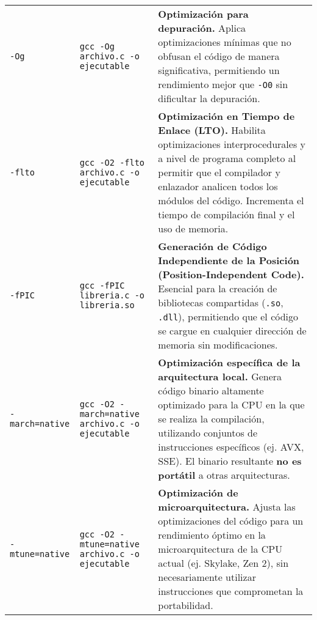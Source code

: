 \documentclass{article}
\begin{document}
\begin{longtable}{l p{4.5cm} p{8cm}}
		\addlinespace
		\texttt{-Og} & \texttt{gcc -Og archivo.c -o ejecutable} & \textbf{Optimización para depuración.} Aplica optimizaciones mínimas que no obfusan el código de manera significativa, permitiendo un rendimiento mejor que \texttt{-O0} sin dificultar la depuración. \\
		\addlinespace
		\texttt{-flto} & \texttt{gcc -O2 -flto archivo.c -o ejecutable} & \textbf{Optimización en Tiempo de Enlace (LTO).} Habilita optimizaciones interprocedurales y a nivel de programa completo al permitir que el compilador y enlazador analicen todos los módulos del código. Incrementa el tiempo de compilación final y el uso de memoria. \\
		\addlinespace
		\texttt{-fPIC} & \texttt{gcc -fPIC libreria.c -o libreria.so} & \textbf{Generación de Código Independiente de la Posición (Position-Independent Code).} Esencial para la creación de bibliotecas compartidas (\texttt{.so}, \texttt{.dll}), permitiendo que el código se cargue en cualquier dirección de memoria sin modificaciones. \\
		\addlinespace
		\texttt{-march=native} & \texttt{gcc -O2 -march=native archivo.c -o ejecutable} & \textbf{Optimización específica de la arquitectura local.} Genera código binario altamente optimizado para la CPU en la que se realiza la compilación, utilizando conjuntos de instrucciones específicos (ej. AVX, SSE). El binario resultante \textbf{no es portátil} a otras arquitecturas. \\
		\addlinespace
		\texttt{-mtune=native} & \texttt{gcc -O2 -mtune=native archivo.c -o ejecutable} & \textbf{Optimización de microarquitectura.} Ajusta las optimizaciones del código para un rendimiento óptimo en la microarquitectura de la CPU actual (ej. Skylake, Zen 2), sin necesariamente utilizar instrucciones que comprometan la portabilidad. \\
	\end{longtable}
	
\end{document}
